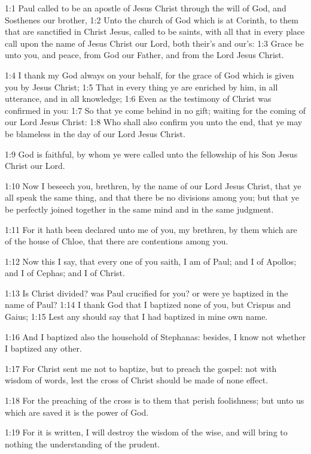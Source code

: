 

1:1 Paul called to be an apostle of Jesus Christ through the will of God, and Sosthenes our brother, 1:2 Unto the church of God which is at Corinth, to them that are sanctified in Christ Jesus, called to be saints, with all that in every place call upon the name of Jesus Christ our Lord, both their's and our's: 1:3 Grace be unto you, and peace, from God our Father, and from the Lord Jesus Christ.

1:4 I thank my God always on your behalf, for the grace of God which is given you by Jesus Christ; 1:5 That in every thing ye are enriched by him, in all utterance, and in all knowledge; 1:6 Even as the testimony of Christ was confirmed in you: 1:7 So that ye come behind in no gift; waiting for the coming of our Lord Jesus Christ: 1:8 Who shall also confirm you unto the end, that ye may be blameless in the day of our Lord Jesus Christ.

1:9 God is faithful, by whom ye were called unto the fellowship of his Son Jesus Christ our Lord.

1:10 Now I beseech you, brethren, by the name of our Lord Jesus Christ, that ye all speak the same thing, and that there be no divisions among you; but that ye be perfectly joined together in the same mind and in the same judgment.

1:11 For it hath been declared unto me of you, my brethren, by them which are of the house of Chloe, that there are contentions among you.

1:12 Now this I say, that every one of you saith, I am of Paul; and I of Apollos; and I of Cephas; and I of Christ.

1:13 Is Christ divided? was Paul crucified for you? or were ye baptized in the name of Paul?  1:14 I thank God that I baptized none of you, but Crispus and Gaius; 1:15 Lest any should say that I had baptized in mine own name.

1:16 And I baptized also the household of Stephanas: besides, I know not whether I baptized any other.

1:17 For Christ sent me not to baptize, but to preach the gospel: not with wisdom of words, lest the cross of Christ should be made of none effect.

1:18 For the preaching of the cross is to them that perish foolishness; but unto us which are saved it is the power of God.

1:19 For it is written, I will destroy the wisdom of the wise, and will bring to nothing the understanding of the prudent.

